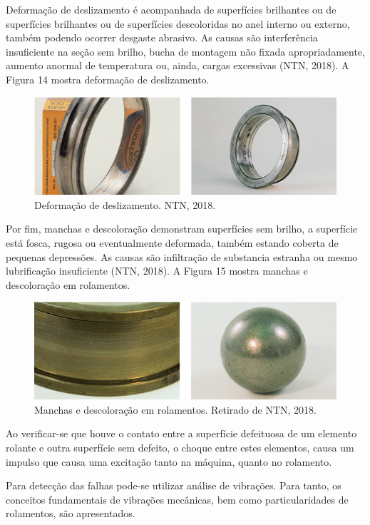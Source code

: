 \documentclass[
	12pt,				
	oneside,			
	a4paper,			
	english,			
	brazil				
	]{abntex2ppgsi}
\begin{document}
Deformação de deslizamento é acompanhada de superfícies brilhantes ou de superfícies brilhantes ou de superfícies descoloridas no anel interno ou externo, também podendo ocorrer desgaste abrasivo. As causas são interferência insuficiente na seção sem brilho, bucha de montagem não fixada apropriadamente, aumento anormal de temperatura ou, ainda, cargas excessivas (NTN, 2018). A Figura 14 mostra deformação de deslizamento.

\begin{figure}[!htb]
\centering
\includegraphics{Figura14}
\caption {Deformação de deslizamento. NTN, 2018.}
\label{Figura14}
\end{figure}

Por fim, manchas e descoloração demonstram superfícies sem brilho, a superfície está fosca, rugosa ou eventualmente deformada, também estando coberta de pequenas depressões. As causas são infiltração de substancia estranha ou mesmo lubrificação insuficiente (NTN, 2018). A Figura 15 mostra manchas e descoloração em rolamentos.

\begin{figure}[!htb]
\centering
\includegraphics{Figura15}
\caption {Manchas e descoloração em rolamentos. Retirado de NTN, 2018.}
\label{Figura15}
\end{figure}

Ao verificar-se que houve o contato entre a superfície defeituosa de um elemento rolante e outra superfície sem defeito, o choque entre estes elementos, causa um impulso que causa uma excitação tanto na máquina, quanto no rolamento. 

Para detecção das falhas pode-se utilizar análise de vibrações. Para tanto, os conceitos fundamentais de vibrações mecânicas, bem como particularidades de rolamentos, são apresentados.
\end{document}
